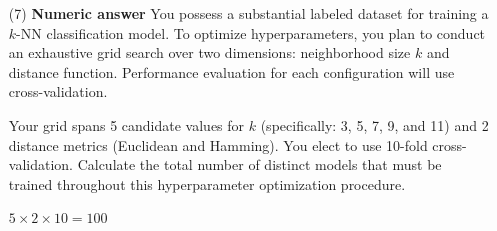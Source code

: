 \documentclass[11pt,addpoints,answers]{exam}
\begin{document}
\begin{enumerate}[label=\alph*), itemsep=10pt]
		
		\item[(7)] \textbf{Numeric answer} You possess a substantial labeled dataset for training a $k$-NN classification model. To optimize hyperparameters, you plan to conduct an exhaustive grid search over two dimensions: neighborhood size $k$ and distance function. Performance evaluation for each configuration will use cross-validation.
		
		Your grid spans 5 candidate values for $k$ (specifically: 3, 5, 7, 9, and 11) and 2 distance metrics (Euclidean and Hamming). You elect to use 10-fold cross-validation. Calculate the total number of distinct models that must be trained throughout this hyperparameter optimization procedure.
		
		\begin{answer_box}[title=Your answer:,height=2cm,width=5cm]
			$5 \times 2 \times 10 = 100$
		\end{answer_box}
	\end{enumerate}
	\clearpage
	
	
\end{document}
